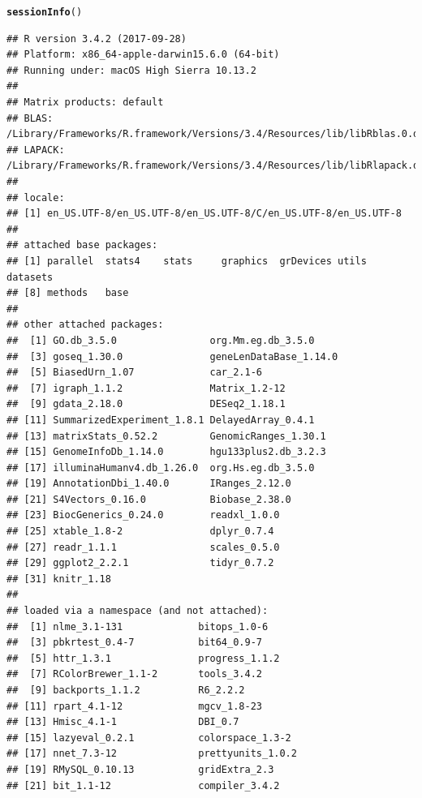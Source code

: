 \documentclass{article}\usepackage[]{graphicx}\usepackage[]{color}
\makeatletter
\newcommand{\hlstd}[1]{\textcolor[rgb]{0.345,0.345,0.345}{#1}}%
\newcommand{\hlkwd}[1]{\textcolor[rgb]{0.737,0.353,0.396}{\textbf{#1}}}%
\newenvironment{kframe}{%
 \def\at@end@of@kframe{}%
 \ifinner\ifhmode%
  \def\at@end@of@kframe{\end{minipage}}%
  \begin{minipage}{\columnwidth}%
 \fi\fi%
 \def\FrameCommand##1{\hskip\@totalleftmargin \hskip-\fboxsep
 \colorbox{shadecolor}{##1}\hskip-\fboxsep
     \hskip-\linewidth \hskip-\@totalleftmargin \hskip\columnwidth}%
 \MakeFramed {\advance\hsize-\width
   \@totalleftmargin\z@ \linewidth\hsize
   \@setminipage}}%
 {\par\unskip\endMakeFramed%
 \at@end@of@kframe}
\newenvironment{knitrout}{}{} %
\makeatother
\begin{document}
\begin{knitrout}\small
{}\color{fgcolor}\begin{kframe}
\begin{alltt}
\hlkwd{sessionInfo}\hlstd{()}
\end{alltt}
\begin{verbatim}
## R version 3.4.2 (2017-09-28)
## Platform: x86_64-apple-darwin15.6.0 (64-bit)
## Running under: macOS High Sierra 10.13.2
## 
## Matrix products: default
## BLAS: /Library/Frameworks/R.framework/Versions/3.4/Resources/lib/libRblas.0.dylib
## LAPACK: /Library/Frameworks/R.framework/Versions/3.4/Resources/lib/libRlapack.dylib
## 
## locale:
## [1] en_US.UTF-8/en_US.UTF-8/en_US.UTF-8/C/en_US.UTF-8/en_US.UTF-8
## 
## attached base packages:
## [1] parallel  stats4    stats     graphics  grDevices utils     datasets 
## [8] methods   base     
## 
## other attached packages:
##  [1] GO.db_3.5.0                org.Mm.eg.db_3.5.0        
##  [3] goseq_1.30.0               geneLenDataBase_1.14.0    
##  [5] BiasedUrn_1.07             car_2.1-6                 
##  [7] igraph_1.1.2               Matrix_1.2-12             
##  [9] gdata_2.18.0               DESeq2_1.18.1             
## [11] SummarizedExperiment_1.8.1 DelayedArray_0.4.1        
## [13] matrixStats_0.52.2         GenomicRanges_1.30.1      
## [15] GenomeInfoDb_1.14.0        hgu133plus2.db_3.2.3      
## [17] illuminaHumanv4.db_1.26.0  org.Hs.eg.db_3.5.0        
## [19] AnnotationDbi_1.40.0       IRanges_2.12.0            
## [21] S4Vectors_0.16.0           Biobase_2.38.0            
## [23] BiocGenerics_0.24.0        readxl_1.0.0              
## [25] xtable_1.8-2               dplyr_0.7.4               
## [27] readr_1.1.1                scales_0.5.0              
## [29] ggplot2_2.2.1              tidyr_0.7.2               
## [31] knitr_1.18                
## 
## loaded via a namespace (and not attached):
##  [1] nlme_3.1-131             bitops_1.0-6            
##  [3] pbkrtest_0.4-7           bit64_0.9-7             
##  [5] httr_1.3.1               progress_1.1.2          
##  [7] RColorBrewer_1.1-2       tools_3.4.2             
##  [9] backports_1.1.2          R6_2.2.2                
## [11] rpart_4.1-12             mgcv_1.8-23             
## [13] Hmisc_4.1-1              DBI_0.7                 
## [15] lazyeval_0.2.1           colorspace_1.3-2        
## [17] nnet_7.3-12              prettyunits_1.0.2       
## [19] RMySQL_0.10.13           gridExtra_2.3           
## [21] bit_1.1-12               compiler_3.4.2          

\end{verbatim}
\end{kframe}
\end{knitrout}
\end{document}
